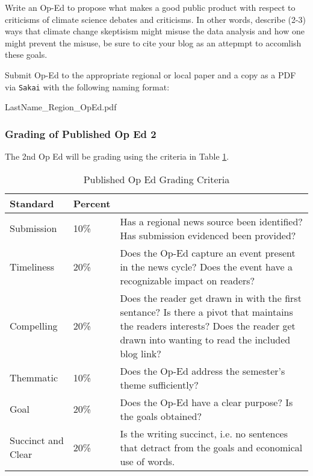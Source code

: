 Write an Op-Ed to propose what makes a good public product with respect to criticisms of climate science debates and criticisms. In other words, describe (2-3) ways that climate change skeptisism might misuse the data analysis and how one might prevent the misuse, be sure to cite your blog as an attepmpt to accomlish these goals. 

Submit Op-Ed to the appropriate regional or local paper and a copy as a PDF via \texttt{Sakai} with the following naming format: 

\begin{center}
LastName\_Region\_OpEd.pdf
\end{center}

\subsubsection{Grading of Published Op Ed 2}

The 2nd Op Ed will be grading using the criteria in Table \ref{tab:oped2grading}.

\begin{table}[h]
\centering
\caption{Published Op Ed Grading Criteria}
\label{tab:oped2grading}
\begin{tabular}{llp{3in}}\hline
Standard            & Percent \\ \hline\hline
Submission          & 10\% & Has a regional news source been identified? Has submission evidenced been provided?\\ 
Timeliness          & 20\% & Does the Op-Ed capture an event present in the news cycle? Does the event have a recognizable impact on readers? \\
Compelling          & 20\%  & Does the reader get drawn in with the first sentance?  Is there a pivot that maintains the readers interests? Does the reader get drawn into wanting to read the included blog link? \\
Themmatic     & 10\% & Does the Op-Ed address the semester's theme sufficiently?\\
Goal             & 20\% & Does the Op-Ed have a clear purpose? Is the goals obtained? \\
Succinct and Clear  & 20\% & Is the writing succinct, i.e. no sentences that detract from the goals and economical use of words.\\ \hline
\end{tabular}
\end{table}




